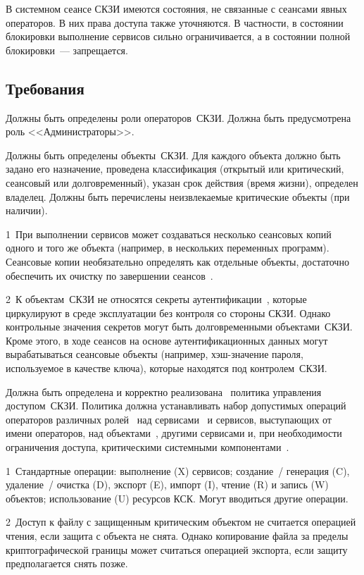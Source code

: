 В системном сеансе СКЗИ имеются состояния, не связанные с сеансами явных 
операторов. В них права доступа также уточняются. 
%
В частности, в состоянии блокировки выполнение сервисов 
сильно ограничивается, а в состоянии полной блокировки~--- запрещается. 

\subsection{Требования}\label{AC.Reqs}

\label{R.AC.Roles} %
Должны быть определены роли операторов~СКЗИ. 
Должна быть предусмотрена роль <<Администраторы>>.

\label{R.AC.Objects} %
Должны быть определены объекты~СКЗИ.
Для каждого объекта должно быть задано его назначение,
проведена классификация (открытый или критический, сеансовый или 
долговременный), указан срок действия (время жизни), определен владелец.
Должны быть перечислены неизвлекаемые критические объекты (при наличии).

\begin{notes}
1~При выполнении сервисов может создаваться несколько сеансовых копий одного и
того же объекта (например, в нескольких переменных программ).
%
Сеансовые копии необязательно определять как отдельные объекты,
достаточно обеспечить их очистку по завершении сеансов~.

2~К объектам~СКЗИ не относятся секреты 
аутентификации~, которые циркулируют в среде эксплуатации 
без контроля со стороны СКЗИ. 
%
Однако контрольные значения секретов могут быть долговременными объектами~СКЗИ.
Кроме этого, в ходе сеансов на основе аутентификационных данных могут
вырабатываться сеансовые объекты (например, хэш-значение пароля, используемое в
качестве ключа), которые находятся под контролем~СКЗИ.
\end{notes}

\label{R.AC.Policy} %
Должна быть определена и корректно реализована~ 
политика управления доступом~СКЗИ.
Политика должна устанавливать набор допустимых 
операций операторов различных ролей~ 
над сервисами~ и сервисов, 
выступающих от имени операторов, над объектами~,
другими сервисами и, при необходимости ограничения доступа, 
критическими системными компонентами~.

\begin{notes}
1~Стандартные операции: выполнение (X) сервисов; 
создание~/ генерация (C), удаление~/ очистка (D), экспорт (E), импорт (I), 
чтение (R) и запись (W) объектов; 
использование (U) ресурсов КСК.
%
Могут вводиться другие операции.

2~Доступ к файлу с защищенным критическим объектом не считается 
операцией чтения, если защита с объекта не снята. Однако копирование файла за 
пределы криптографической границы может считаться операцией экспорта, если 
защиту предполагается снять позже.
\end{notes}

